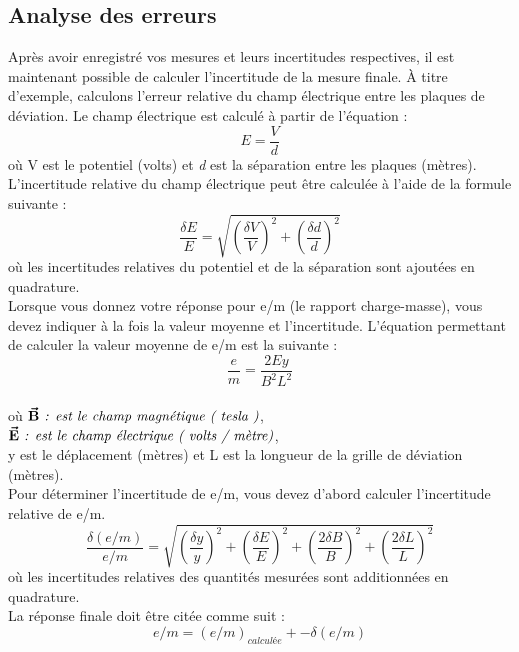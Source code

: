 \documentclass[../main.tex]{subfiles}
\begin{document}
\subsection{Analyse des erreurs}
Après avoir enregistré vos mesures et leurs incertitudes respectives, il est maintenant possible de calculer l'incertitude de la mesure finale.  À titre d'exemple, calculons l'erreur relative du champ électrique entre les plaques de déviation.  Le champ électrique est calculé à partir de l'équation :\\
$$E=\frac{V}{d}$$ 
où V est le potentiel (volts) et \textit{d} est la séparation entre les plaques (mètres).  L'incertitude relative du champ électrique peut être calculée à l'aide de la formule suivante :\\
$$\frac{\delta E}{E} = \sqrt{(\frac{\delta V}{V})^2 + (\frac{\delta d}{d})^2}$$
où les incertitudes relatives du potentiel et de la séparation sont ajoutées en quadrature.\\
Lorsque vous donnez votre réponse pour e/m (le rapport charge-masse), vous devez indiquer à la fois la valeur moyenne et l'incertitude.  L'équation permettant de calculer la valeur moyenne de e/m est la suivante :\\
$$\frac{e}{m} = \frac{2Ey}{B^2L^2}$$ \\
où  $\vectorbold*{\va{B}} \textit{ : est le champ magnétique ( tesla )}$,  \\ 
$ \vectorbold*{\va{E}}  \textit{ : est le champ électrique ( volts / mètre)}$, \\ y est le déplacement (mètres) et L est la longueur de la grille de déviation (mètres).\\
Pour déterminer l'incertitude de e/m, vous devez d'abord calculer l'incertitude relative de e/m.\\
$$\frac{\delta (e/m)}{e/m} = \sqrt{(\frac{\delta y}{y})^2 + (\frac{\delta E}{E})^2 + (\frac{2 \delta B}{B})^2 +(\frac{2 \delta L}{L})^2 }$$
où les incertitudes relatives des quantités mesurées sont additionnées en quadrature.\\
La réponse finale doit être citée comme suit :\\
$$e/m = (e/m)_{calculée} +- \delta(e/m)$$
\end{document}
